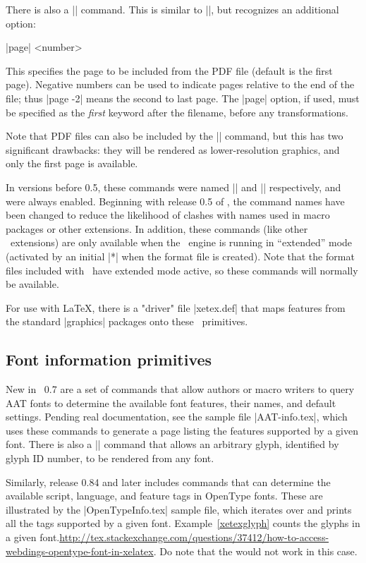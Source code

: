 There is also a |\XeTeXpdffile| command. This is similar to |\XeTeXpicfile|, but recognizes an additional option:{\obeylines\parskip0pt\parindent
	|page| <number>\par}\noindent
This specifies the page to be included from the PDF file (default is the first page). Negative numbers can be used to indicate pages relative to the end of the file; thus |page -2| means the second to last page. The |page| option, if used, must be specified as the {\em first} keyword after the filename, before any transformations.

Note that PDF files can also be included by the |\XeTeXpicfile| command, but this has two significant drawbacks: they will be rendered as lower-resolution graphics, and only the first page is available.

In versions before 0.5, these commands were named |\picfile| and |\pdffile| respectively, and were always enabled. Beginning with release 0.5 of \XeTeX, the command names have been changed to reduce the likelihood of clashes with names used in macro packages or other extensions. In addition, these commands (like other \eTeX\ extensions) are only available when the \XeTeX\ engine is running in “extended” mode (activated by an initial |*| when the format file is created). Note that the format files included with \XeTeX\ have extended mode active, so these commands will normally be available.

For use with \LaTeX, there is a "driver" file |xetex.def| that maps features from the standard |graphics| packages onto these \XeTeX\ primitives.

\subsection{Font information primitives}

\CMDI{\XeTeXglyph}
New in \XeTeX\ 0.7 are a set of commands that allow authors or macro writers to query AAT fonts to determine the available font features, their names, and default settings. Pending real documentation, see the sample file |AAT-info.tex|, which uses these commands to generate a page listing the features supported by a given font. There is also a |\XeTeXglyph| command that allows an arbitrary glyph, identified by glyph ID number, to be rendered from any font.

Similarly, release 0.84 and later includes commands that can determine the available script, language, and feature tags in OpenType fonts. These are illustrated by the |OpenTypeInfo.tex| sample file, which iterates over and prints all the tags supported by a given font. Example~\ref{xetexglyph} counts the glyphs in a given font.\url{http://tex.stackexchange.com/questions/37412/how-to-access-webdings-opentype-font-in-xelatex}. Do note that the  would not work in this case.

